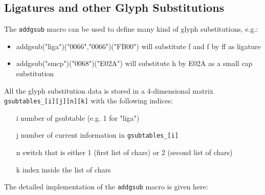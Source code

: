 \documentclass{scrartcl}
\begin{document}
\subsection{Ligatures and other Glyph Substitutions}
%
The \texttt{addgsub} macro can be used to define many kind of glyph substitutions, e.g.:
\begin{itemize}
	\item addgsub("liga")("0066","0066")("FB00") will substitute f and f by ff as ligature
	\item addgsub("smcp")("0068")("E02A") will substitute h by E02A as a small cap substitution
\end{itemize}
%
All the glyph substitution data is stored in a 4-dimensional matrix \texttt{gsubtables\_[i][j][n][k]} with the following indices:
\begin{itemize}
	\item[i] number of gsubtable (e.g. 1 for "liga")
	\item[j] number of current information in \texttt{gsubtables\_[i]}
	\item[n] switch that is either 1 (first list of chars) or 2 (second list of chars)
	\item[k] index inside the list of chars
\end{itemize}
%
The detailed implementation of the \texttt{addgsub} macro is given here:
%
\lstset{language=MetaPost,columns=fullflexible}
\end{document}
